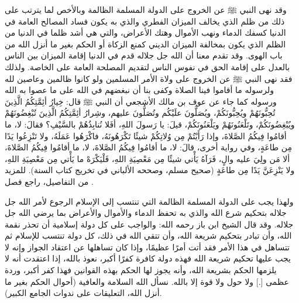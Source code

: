 وقد نهى النبي ﷺ عن الخروج على الدولة المسلمة الظالمة وبالأخص لما يترتب على ذلك من ظلم الذي يخالف الميزان الفطري والذي به يكون فساد المصالح العامة في الدنيا كسفك الدماء ونهب الأموال وهتك الأعراض، والتي هي أشد ظلما في الدنيا من الظلم الذي يكون بمخالفة الميزان الديني كمنع الزكاة أو الحكم بغير ما أنزل الله من باب الهوى. وقد تقدم معنا أن الله جل جلاله قدم في الدنيا إقامة الميزان بين الناس بالعدل على إقامة الحق في نفوس الناس لتقديم المصلحة العامة على الخاصة.  ولذلك فقد نهى النبي ﷺ عن الخروج على ولاة الأمر المسلمين ولو كانوا ظالمين وعاصين لله ولرسوله  ما أقاموا فينا الصلاة وكفى بنا أن نبغضهم في الله على ما عصوا به الله ورسوله كما جاء عن عوف بن مالك الأشجعي أن النبي ﷺ قال: خِيارُ أئِمَّتِكُمُ الَّذِينَ تُحِبُّونَهُمْ ويُحِبُّونَكُمْ، ويُصَلُّونَ علَيْكُم وتُصَلُّونَ عليهم، وشِرارُ أئِمَّتِكُمُ الَّذِينَ تُبْغِضُونَهُمْ ويُبْغِضُونَكُمْ، وتَلْعَنُونَهُمْ ويَلْعَنُونَكُمْ، قيلَ: يا رَسولَ اللهِ، أفَلا نُنابِذُهُمْ بالسَّيْفِ؟ فقالَ: لا، ما أقامُوا فِيكُمُ الصَّلاةَ، وإذا رَأَيْتُمْ مِن وُلاتِكُمْ شيئًا تَكْرَهُونَهُ، فاكْرَهُوا عَمَلَهُ، ولا تَنْزِعُوا يَدًا مِن طاعَةٍ، وفي رواية أخرى، قالَ: لا، ما أقامُوا فِيكُمُ الصَّلاةَ، لا، ما أقامُوا فِيكُمُ الصَّلاةَ، ألا مَن ولِيَ عليه والٍ، فَرَآهُ يَأْتي شيئًا مِن مَعْصِيَةِ اللهِ، فَلْيَكْرَهْ ما يَأْتي مِن مَعْصِيَةِ اللهِ، ولا يَنْزِعَنَّ يَدًا مِن طاعَةٍ {\footnotesize (صحيح مسلم، وصححه الألباني في تخريج كتاب السنة)}. للمزيد من التفاصيل، راجع فصل .

ولهذا يجب على الدولة المسلمة الظالمة التي تنتسب إلى الإسلام الرجوع لأمر الله جل جلاله بتحكيم شرع الله والذي به تحفظ الدماء والأموال والأعراض بما يرضي الله جل جلاله. وقد قال الشيخ ابن باز رحمه الله: والواجب على كل دولة إسلامية أن تحذر نقمة الله، وأن تبادر بتحكيم شريعة الله، وأن تتقي الله في ذلك، كل دولة تنتسب للإسلام ثم تتساهل في هذا الأمر فقد أتت أمرًا عظيمًا، وإذا كان تساهلها عن اعتقاد الجواز وإنه لا يجب عليها تحكيم شريعة الله فهذه دولة كافرة كفرًا أكبر، نعوذ بالله، إذا اعتقدت أنه لا يلزمها الحكم بشريعة الله، وأنه يجوز لها الحكم بهذه القوانين فهذا كفر أكبر، وردة عظمى [.] ولا حول ولا قوة إلا بالله. نسأل الله السلامة والعافية {\footnotesize (أحوال الحكم بغير ما أنزل الله، التعليقات على ندوات الجامع الكبير)}. 



